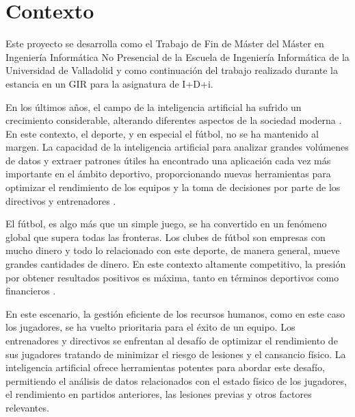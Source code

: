 


\section{Contexto}
Este proyecto se desarrolla como el Trabajo de Fin de Máster del Máster en Ingeniería Informática No Presencial de la Escuela de Ingeniería Informática de la Universidad de Valladolid y como continuación del trabajo realizado durante la estancia en un GIR para la asignatura de I+D+i.

En los últimos años, el campo de la inteligencia artificial ha sufrido un crecimiento considerable, alterando diferentes aspectos de la sociedad moderna \cite{ia2}. En este contexto, el deporte, y en especial el fútbol, no se ha mantenido al margen. La capacidad de la inteligencia artificial para analizar grandes volúmenes de datos y extraer patrones útiles ha encontrado una aplicación cada vez más importante en el ámbito deportivo, proporcionando nuevas herramientas para optimizar el rendimiento de los equipos y la toma de decisiones por parte de los directivos y entrenadores \cite{ia1}.

El fútbol, es algo más que un simple juego, se ha convertido en un fenómeno global que supera todas las fronteras. Los clubes de fútbol son empresas con mucho dinero y todo lo relacionado con este deporte, de manera general, mueve grandes cantidades de dinero. En este contexto altamente competitivo, la presión por obtener resultados positivos es máxima, tanto en términos deportivos como financieros \cite{dinero}. 

En este escenario, la gestión eficiente de los recursos humanos, como en este caso los jugadores, se ha vuelto prioritaria para el éxito de un equipo. Los entrenadores y directivos se enfrentan al desafío de optimizar el rendimiento de sus jugadores tratando de minimizar el riesgo de lesiones y el cansancio físico. La inteligencia artificial ofrece herramientas potentes para abordar este desafío, permitiendo el análisis de datos relacionados con el estado físico de los jugadores, el rendimiento en partidos anteriores, las lesiones previas y otros factores relevantes.

